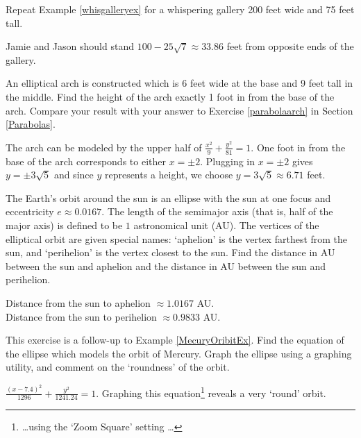 \documentclass{ximera}
\begin{document}
\begin{problem}
    Repeat Example \ref{whisgalleryex} for a whispering gallery 200 feet wide and 75 feet tall.

\begin{solution}
    Jamie and Jason should stand $100-25\sqrt{7} \approx 33.86$ feet from opposite ends of the gallery.
\end{solution}
\end{problem}

\begin{problem}\label{ellipsearchex} 
    An elliptical arch is constructed which is 6 feet wide at the base and 9 feet tall in the middle. Find the height of the arch exactly 1 foot in from the base of the arch. Compare your result with your answer to Exercise \ref{parabolaarch} in Section \ref{Parabolas}.

\begin{solution}
    The arch can be modeled by the upper half of $\frac{x^2}{9} + \frac{y^2}{81} = 1$.  One foot in from the base of the arch corresponds to either $x = \pm 2$.  Plugging in $x = \pm 2$ gives $y = \pm 3\sqrt{5}$ and since $y$ represents a height, we choose $y=3\sqrt{5} \approx 6.71$ feet. 
\end{solution}
\end{problem}

\begin{problem}
    The Earth's orbit around the sun is an ellipse with the sun at one focus and eccentricity $e \approx 0.0167$.  The length of the semimajor axis (that is, half of the major axis) is defined to be $1$ astronomical unit (AU).  The vertices of the elliptical orbit are given special names: `aphelion' is the vertex farthest from the sun, and  `perihelion' is the vertex closest to the sun.  Find the distance in AU between the sun and aphelion and the distance in AU between the sun and perihelion.

\begin{solution}
     Distance from the sun to aphelion $\approx 1.0167$ AU.\\
Distance from the sun to perihelion $\approx 0.9833$ AU.
\end{solution}
\end{problem}

\begin{problem}\label{MercuryOrbitGraph} 
    This exercise is a follow-up to Example \ref{MecuryOribitEx}.  Find the equation of the ellipse which models the orbit of Mercury.  Graph the ellipse using a graphing utility, and comment on the `roundness' of the orbit.

\begin{solution}
    $\frac{(x-7.4)^2}{1296} + \frac{y^2}{1241.24} = 1$.  Graphing this equation\footnote{\ldots using the `Zoom Square' setting \ldots} reveals a very `round' orbit.
\end{solution}
\end{problem}
\end{document}
